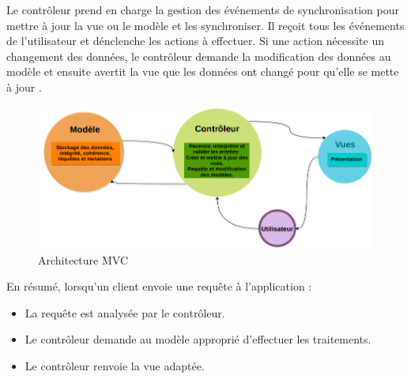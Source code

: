\par Le contrôleur prend en charge la gestion des événements de synchronisation pour mettre à jour la vue ou le modèle et les synchroniser. Il reçoit tous les événements de l'utilisateur et dénclenche les actions à effectuer. Si une action nécessite un changement des données, le contrôleur demande la modification des données au modèle et ensuite avertit la vue que les données ont changé pour qu'elle se mette à jour \cite{2}.
\begin{figure}[h]
    \centering
    \includegraphics[scale=0.5]{figures/a11.png}
    \caption{Architecture MVC}
    \label{fig:Arch_MVC}
\end{figure}
\par En résumé, lorsqu'un client envoie une requête à l'application :
\begin{itemize}
    \item 	La requête est analysée par le contrôleur. 
    \item Le contrôleur demande au modèle approprié d'effectuer les traitements.
    \item 	Le contrôleur renvoie la vue adaptée. 
\end{itemize}

